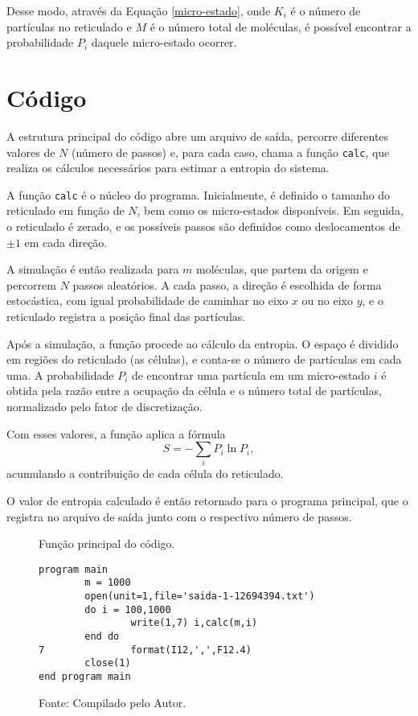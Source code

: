 Desse modo, através da Equação \ref{micro-estado}, onde $K_i$ é o número de partículas 
no reticulado e $M$ é o número total de moléculas, é possível encontrar a probabilidade 
$P_i$ daquele micro-estado ocorrer.



\section*{Código}

A estrutura principal do código abre um arquivo de saída, percorre 
diferentes valores de $N$ (número de passos) e, para cada caso, chama a função \texttt{calc}, 
que realiza os cálculos necessários para estimar a entropia do sistema.

A função \texttt{calc} é o núcleo do programa. Inicialmente, é definido o tamanho do 
reticulado em função de $N$, bem como os micro-estados disponíveis. Em seguida, o reticulado 
é zerado, e os possíveis passos são definidos como deslocamentos de $\pm 1$ em cada direção. 

A simulação é então realizada para $m$ moléculas, que partem da origem e percorrem $N$ 
passos aleatórios. A cada passo, a direção é escolhida de forma estocástica, com igual 
probabilidade de caminhar no eixo $x$ ou no eixo $y$, e o reticulado registra a posição 
final das partículas.

Após a simulação, a função procede ao cálculo da entropia. O espaço é dividido em regiões 
do reticulado (as células), e conta-se o número de partículas em cada uma. A probabilidade 
$P_i$ de encontrar uma partícula em um micro-estado $i$ é obtida pela razão entre a ocupação 
da célula e o número total de partículas, normalizado pelo fator de discretização. 

Com esses valores, a função aplica a fórmula
\[
S = - \sum_i P_i \ln P_i,
\]
acumulando a contribuição de cada célula do reticulado. 

O valor de entropia calculado é então retornado para o programa principal, que o registra 
no arquivo de saída junto com o respectivo número de passos.


\begin{figure}[h!]
\centering
\caption{Função principal do código.}
\centering
\begin{lstlisting}
program main
        m = 1000
        open(unit=1,file='saida-1-12694394.txt')
        do i = 100,1000
                write(1,7) i,calc(m,i)
        end do
7               format(I12,',',F12.4)
        close(1)
end program main

\end{lstlisting}
\caption*{Fonte: Compilado pelo Autor.}
\label{fig:tarefa 4 - função principal do código}
\end{figure}

